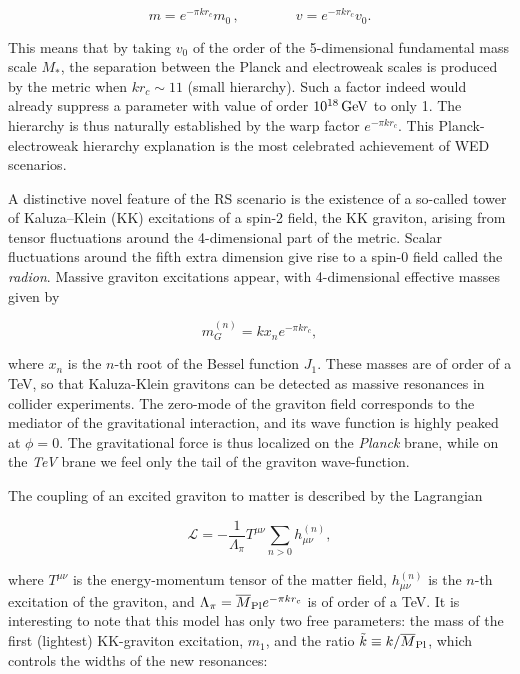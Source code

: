 \begin{equation}\label{eqn:WED_6}
m = e^{-\pi kr_c}m_0 \, , \qquad\qquad v = e^{-\pi kr_c}v_0.
\end{equation}

This means that by taking $v_0$ of the order of the 5-dimensional fundamental mass scale $M_*$, the separation between the Planck and electroweak scales
is produced by the metric when $kr_c \sim 11$ (small hierarchy). Such a factor indeed would already suppress a parameter with value of order $10^{18}\,\text{Ge\hspace{-.08em}V}$ to only 1\TeV.
The hierarchy is thus naturally established by the warp factor $e^{-\pi kr_c}$.
This Planck-electroweak hierarchy explanation is the most celebrated achievement of WED scenarios.

A distinctive novel feature of the RS scenario is the existence of a so-called tower of Kaluza--Klein (KK) excitations of a spin-2 field, the KK graviton, arising from tensor fluctuations 
around the 4-dimensional part of the metric. Scalar fluctuations around the fifth extra dimension give rise to a spin-0 field called the \textit{radion}.
Massive graviton excitations appear, with 4-dimensional effective masses given by

\begin{equation}\label{eqn:WED_7}
m_G^{(n)} = kx_ne^{-\pi kr_c},
\end{equation}

\noindent where $x_n$ is the $n$-th root of the Bessel function $J_1$. These masses are of order of a TeV, so that Kaluza-Klein gravitons can be detected as massive resonances in collider experiments. 
The zero-mode of the graviton field corresponds to the mediator of the gravitational interaction, and its wave function is highly peaked at $\phi = 0$. The gravitational force is thus localized on the \textit{Planck} brane, while on the \textit{TeV} brane we feel only the tail of the graviton wave-function. %

The coupling of an excited graviton to matter is described by the Lagrangian

\begin{equation}\label{eqn:WED_8}
\mathcal{L} = - \frac{1}{\Lambda_\pi}T^{\mu\nu}\sum_{n>0}h^{(n)}_{\mu\nu},
\end{equation}

\noindent where $T^{\mu\nu}$ is the energy-momentum tensor of the matter field, $h^{(n)}_{\mu\nu}$ is the $n$-th excitation of the graviton,
and $\Lambda_\pi = \overline{M}_\mathrm{Pl} e^{-\pi kr_c}$ is of order of a TeV.
It is interesting to note that this model has only two free parameters: the mass of the first (lightest) KK-graviton excitation, $m_1$, and the ratio $\tilde{k} \equiv  k/\overline{M}_\mathrm{Pl}$, which controls the widths of the new resonances:

